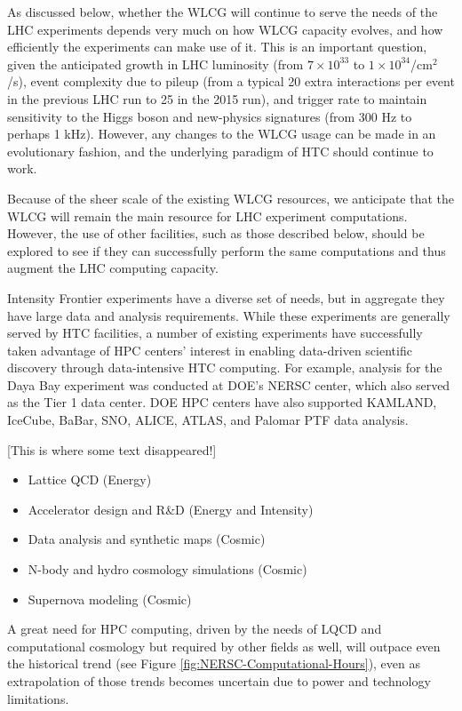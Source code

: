 As discussed below, whether the WLCG will continue to serve the needs of the LHC experiments depends very much on how WLCG capacity evolves, and how efficiently the experiments can make use of it.  This is an important question, given the anticipated growth in LHC luminosity (from $7 \times 10^{33}$ to $1 \times 10^{34}$/cm$^2$/s), event complexity due to pileup (from a typical 20 extra interactions per event in the previous LHC run to 25 in the 2015 run), and trigger rate to maintain sensitivity to the Higgs boson and new-physics signatures (from 300 Hz to perhaps 1 kHz).  However, any changes to the WLCG usage can be made in an evolutionary fashion, and the underlying paradigm of HTC should continue to work.

Because of the sheer scale of the existing WLCG resources, we anticipate that the WLCG will remain the main resource for LHC experiment computations.  However, the use of other facilities, such as those described below, should be explored to see if they can successfully perform the same computations and thus augment the LHC computing capacity.

Intensity Frontier experiments have a diverse set of needs, but in aggregate they have large data and analysis requirements. While these experiments are generally served by HTC facilities, a number of existing experiments have successfully taken advantage of HPC centers' interest in enabling data-driven scientific discovery through data-intensive HTC computing.  For example, analysis for the Daya Bay experiment was conducted at DOE's NERSC center, which also served as the Tier 1 data center.  DOE HPC centers have also supported KAMLAND, IceCube, BaBar, SNO, ALICE, ATLAS, and Palomar PTF data analysis.

[This is where some text disappeared!]

\begin{itemize}
\item Lattice QCD (Energy)
\item Accelerator design and R\&D (Energy and Intensity)
\item Data analysis and synthetic maps (Cosmic)
\item N-body and hydro cosmology simulations (Cosmic)
\item Supernova modeling (Cosmic)
\end{itemize}

A great need for HPC computing, driven by the needs of LQCD and computational cosmology but required by other fields as well, will outpace even the historical trend (see Figure \ref{fig:NERSC-Computational-Hours}), even as extrapolation of those trends becomes uncertain due to power and technology limitations.

